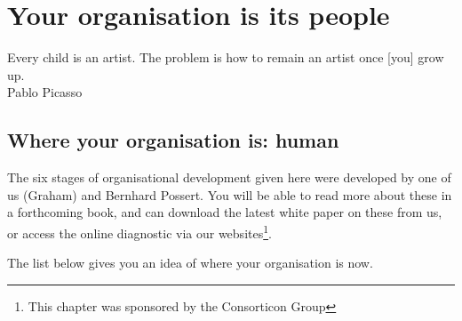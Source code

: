 ﻿\chapter{Your organisation is its people}
\label{chapter:who-is-your-organisation-human}


\begin{chapterquotation}
Every child is an artist. The problem is how to remain an artist once [you] grow up.\\
\raggedleft\textemdash Pablo Picasso 
\end{chapterquotation}




\section{Where your organisation is: human}
\label{section:where-is-your-organisation-human}


The six stages of organisational development given here were developed by one of us (Graham) and Bernhard Possert.  You will be able to read more about these in a forthcoming book, and can download the latest white paper on these from us, or access the online diagnostic via our websites\footnote{This chapter was sponsored by the Consorticon Group}.


The list below gives you an idea of where your organisation is now.


